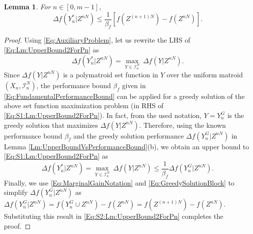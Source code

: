 \documentclass[conference]{IEEEtran}
\newtheorem{lemma}{Lemma}
\begin{document}

\begin{lemma} \label{Lm:UpperBound2ForPn}
For $n\in [0,m-1]$,
\begin{equation} \label{Eq:Lm:UpperBound2ForPn}
\Delta f(Y^*_n\vert Z^{nN}) \leq  \frac{1}{\beta_f}\left[ f(Z^{(n+1)N})-f(Z^{nN})\right].      
\end{equation}
\end{lemma}

\begin{proof}
Using \eqref{Eq:AuxiliaryProblem}, let us rewrite the LHS of \eqref{Eq:Lm:UpperBound2ForPn} as
\begin{equation}\label{Eq:S1:Lm:UpperBound2ForPn}
    \Delta f(Y^*_n\vert Z^{nN}) = \underset{Y\in\mathcal{I}^N_n}{\max}\ \Delta f(Y\vert Z^{nN}).
\end{equation}
Since $\Delta f(Y\vert Z^{nN})$ is a polymatroid set function in $Y$ over the uniform matroid $(X_n,\mathcal{I}^N_n)$, the performance bound $\beta_f$ given in \eqref{Eq:FundamentalPerformanceBound} can be applied for a greedy solution of the above set function maximization problem (in RHS of \eqref{Eq:S1:Lm:UpperBound2ForPn}). In fact, from the used notation, $Y=Y^G_n$ is the greedy solution that maximizes $\Delta f(Y\vert Z^{nN})$. Therefore, using the known performance bound $\beta_f$ and the greedy solution performance $\Delta f(Y^G_n\vert Z^{nN})$ in Lemma \ref{Lm:UpperBoundVsPerformanceBound}(b), we obtain an upper bound to \eqref{Eq:S1:Lm:UpperBound2ForPn} as 
\begin{equation}\label{Eq:S2:Lm:UpperBound2ForPn}
    \Delta f(Y^*_n\vert Z^{nN}) = \underset{Y\in\mathcal{I}^N_n}{\max}\ \Delta f(Y\vert Z^{nN}) \leq \frac{1}{\beta_f} \Delta f(Y^G_n\vert Z^{nN}).
\end{equation}
Finally, we use \eqref{Eq:MarginalGainNotation} and \eqref{Eq:GreedySolutionBlock} to simplify $\Delta f(Y^G_n\vert Z^{nN})$ as $\Delta f(Y^G_n\vert Z^{nN}) = f(Y^G_n\cup Z^{nN})-f(Z^{nN}) = f(Z^{(n+1)N})-f(Z^{nN})$. Substituting this result in \eqref{Eq:S2:Lm:UpperBound2ForPn} completes the proof. \end{proof}
\end{document}
